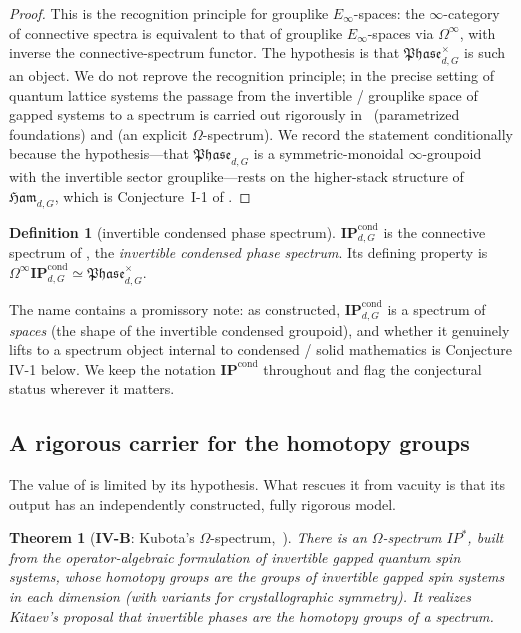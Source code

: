 \documentclass[12pt]{article}
\newcommand{\Ham}{\mathfrak{Ham}}              %
\newcommand{\Phase}{\mathfrak{Phase}}          %
\newcommand{\IPcond}{\mathbf{IP}^{\mathrm{cond}}}  %
\newcommand{\inv}[1]{\Phase_{#1}^{\times}}   %
\newtheorem{theorem}{Theorem}[section]
\theoremstyle{definition}
\newtheorem{definition}[definition]{Definition}
\theoremstyle{remark}
\theoremstyle{plain}
\begin{document}
\begin{proof}
This is the recognition principle for grouplike $E_\infty$-spaces: the
$\infty$-category of connective spectra is equivalent to that of grouplike
$E_\infty$-spaces via $\Omega^\infty$, with inverse the connective-spectrum
functor. The hypothesis is that $\inv{d,G}$ is such an object. We do not reprove
the recognition principle; in the precise setting of quantum lattice systems the
passage from the invertible / grouplike space of gapped systems to a spectrum is
carried out rigorously in~\cite{beaudry-etal} (parametrized foundations) and
\cite{kubota-omega-spectrum} (an explicit $\Omega$-spectrum). We record the
statement conditionally because the hypothesis---that $\Phase_{d,G}$ is a
symmetric-monoidal $\infty$-groupoid with the invertible sector grouplike---rests
on the higher-stack structure of $\Ham_{d,G}$, which is Conjecture~I-1 of
\cite{paperLocality}.
\end{proof}

\begin{definition}[invertible condensed phase spectrum]
\label{def:ipcond}
$\IPcond_{d,G}$ is the connective spectrum of , the
\emph{invertible condensed phase spectrum}. Its defining property is
$\Omega^\infty\IPcond_{d,G}\simeq\inv{d,G}$.
\end{definition}

The name contains a promissory note: as constructed, $\IPcond_{d,G}$ is a
spectrum of \emph{spaces} (the shape of the invertible condensed groupoid), and
whether it genuinely lifts to a spectrum object internal to condensed / solid
mathematics is Conjecture IV-1 below. We keep the notation $\IPcond$ throughout
and flag the conjectural status wherever it matters.

\subsection{A rigorous carrier for the homotopy groups}

The value of  is limited by its hypothesis. What rescues it
from vacuity is that its output has an independently constructed, fully rigorous
model.

\begin{theorem}[\textbf{IV-B}: Kubota's $\Omega$-spectrum,~\cite{kubota-omega-spectrum}]
\label{thm:kubota}
There is an $\Omega$-spectrum $\mathit{IP}^\ast$, built from the operator-algebraic
formulation of invertible gapped quantum spin systems, whose homotopy groups are
the groups of invertible gapped spin systems in each dimension (with variants for
crystallographic symmetry). It realizes Kitaev's proposal
\cite{kitaev-periodic-table} that invertible phases are the homotopy groups of a
spectrum.
\end{theorem}
\end{document}
